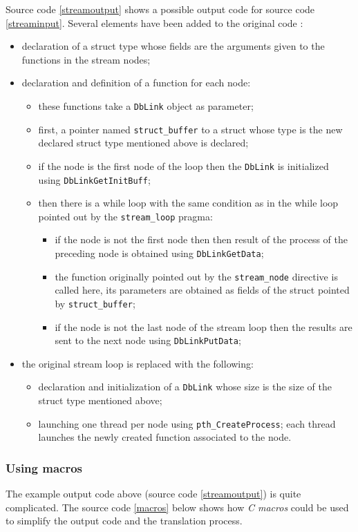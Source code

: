 \documentclass[a4paper]{article}
\begin{document}
	Source code \ref{streamoutput} shows a possible output code for source code \ref{streaminput}. Several elements have been added to the original code :
	\begin{itemize}
		\item declaration of a struct type whose fields are the arguments given to the functions in the stream nodes;
		\item declaration and definition of a function for each node:
		\begin{itemize}
			\item these functions take a \verb+DbLink+ object as parameter;
			\item first, a pointer named \verb+struct_buffer+ to a struct whose type is the new declared struct type mentioned above is declared;
			\item if the node is the first node of the loop then the \verb+DbLink+ is initialized using \verb+DbLinkGetInitBuff+;
			\item then there is a while loop with the same condition as in the while loop pointed out by the \verb+stream_loop+ pragma:
			\begin{itemize}
				\item if the node is not the first node then then result of the process of the preceding node is obtained using \verb+DbLinkGetData+;
				\item the function originally pointed out by the \verb+stream_node+ directive is called here, its parameters are obtained as fields of the struct pointed by \verb+struct_buffer+;
				\item if the node is not the last node of the stream loop then the results are sent to the next node using \verb+DbLinkPutData+;
			\end{itemize}
		\end{itemize}
		\item the original stream loop is replaced with the following:
		\begin{itemize}
			\item declaration and initialization of a \verb+DbLink+ whose size is the size of the struct type mentioned above;
			\item launching one thread per node using \verb+pth_CreateProcess+; each thread launches the newly created function associated to the node.
		\end{itemize}
	\end{itemize}
	
	\subsubsection{Using macros}
	The example output code above (source code \ref{streamoutput}) is
    quite complicated. The source code \ref{macros} below shows how
    \emph{C macros} could be used to simplify the output code and the translation process.
\end{document}
